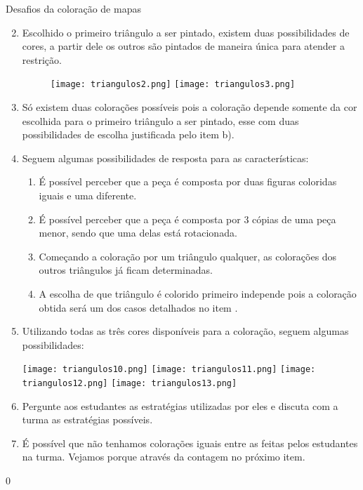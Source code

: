 \begin{answer}{Desafios da coloração de mapas}
{
\begin{enumerate}\setcounter{enumi}{1}
\item Escolhido o primeiro triângulo a ser pintado, existem duas possibilidades de cores, a partir dele os outros são pintados de maneira única para atender a restrição. 

\begin{figure}[H]
\centering

\texttt{[image: triangulos2.png]}
\texttt{[image: triangulos3.png]}
\end{figure}

\item Só existem duas colorações possíveis pois a coloração depende somente da cor escolhida para o primeiro triângulo a ser pintado, esse com duas possibilidades de escolha justificada pelo item b).
\item Seguem algumas possibilidades de resposta para as características:

\begin{enumerate}
\item É possível perceber que a peça é composta por duas figuras coloridas iguais e uma diferente.
\item É possível perceber que a peça é composta por 3 cópias de uma peça menor, sendo que uma delas está rotacionada. 
\item Começando a coloração por um triângulo qualquer, as colorações dos outros triângulos já ficam determinadas.
\item A escolha de que triângulo é colorido primeiro independe pois a coloração obtida será um dos casos detalhados no item .
\end{enumerate}

\item Utilizando todas as três cores disponíveis para a coloração, seguem algumas possibilidades:
\begin{center}
\texttt{[image: triangulos10.png]}
\texttt{[image: triangulos11.png]}
\texttt{[image: triangulos12.png]}
\texttt{[image: triangulos13.png]}
\end{center}

\item Pergunte aos estudantes as estratégias utilizadas por eles e discuta com a turma as estratégias possíveis.

\item É possível que não tenhamos  colorações iguais entre as feitas pelos estudantes na turma. Vejamos porque através da contagem no próximo item. 
\end{enumerate}
}{0}
\end{answer}
